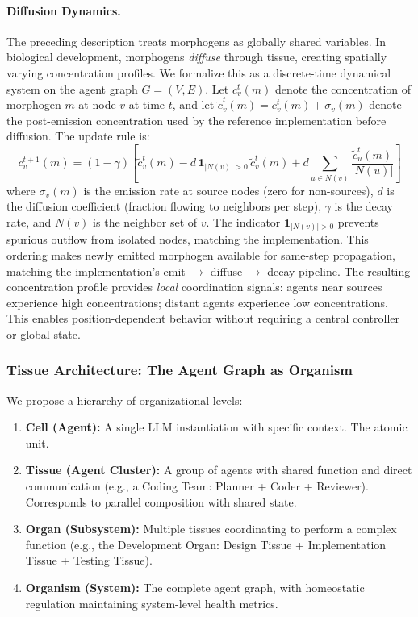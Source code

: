 \paragraph{Diffusion Dynamics.}
The preceding description treats morphogens as globally shared variables. In biological development, morphogens \textit{diffuse} through tissue, creating spatially varying concentration profiles. We formalize this as a discrete-time dynamical system on the agent graph $G = (V, E)$. Let $c_v^t(m)$ denote the concentration of morphogen $m$ at node $v$ at time $t$, and let $\tilde{c}_v^t(m) = c_v^t(m) + \sigma_v(m)$ denote the post-emission concentration used by the reference implementation before diffusion. The update rule is:
\begin{equation}
c_v^{t+1}(m) = (1 - \gamma)\left[\tilde{c}_v^t(m) - d\,\mathbf{1}_{|N(v)|>0}\,\tilde{c}_v^t(m) + d \sum_{u \in N(v)} \frac{\tilde{c}_u^t(m)}{|N(u)|}\right]
\label{eq:morphogen-diffusion}
\end{equation}
where $\sigma_v(m)$ is the emission rate at source nodes (zero for non-sources), $d$ is the diffusion coefficient (fraction flowing to neighbors per step), $\gamma$ is the decay rate, and $N(v)$ is the neighbor set of $v$. The indicator $\mathbf{1}_{|N(v)|>0}$ prevents spurious outflow from isolated nodes, matching the implementation. This ordering makes newly emitted morphogen available for same-step propagation, matching the implementation's emit $\to$ diffuse $\to$ decay pipeline. The resulting concentration profile provides \textit{local} coordination signals: agents near sources experience high concentrations; distant agents experience low concentrations. This enables position-dependent behavior without requiring a central controller or global state.

\subsubsection{Tissue Architecture: The Agent Graph as Organism}

We propose a hierarchy of organizational levels:
\begin{enumerate}[leftmargin=*]
\item \textbf{Cell (Agent):} A single LLM instantiation with specific context. The atomic unit.
\item \textbf{Tissue (Agent Cluster):} A group of agents with shared function and direct communication
(e.g., a Coding Team: Planner + Coder + Reviewer). Corresponds to parallel composition with shared state.
\item \textbf{Organ (Subsystem):} Multiple tissues coordinating to perform a complex function
(e.g., the Development Organ: Design Tissue + Implementation Tissue + Testing Tissue).
\item \textbf{Organism (System):} The complete agent graph, with homeostatic regulation maintaining
system-level health metrics.
\end{enumerate}

